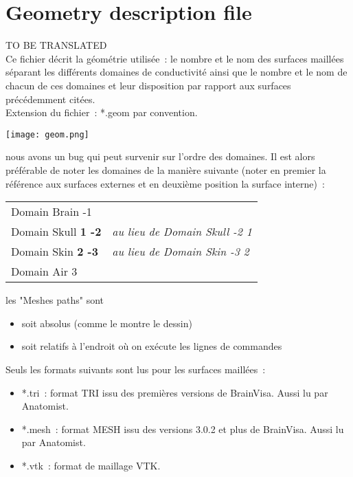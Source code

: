\section{Geometry description file}
\label{sect: annexe 1}
{\huge TO BE TRANSLATED}\\
\noindent
Ce fichier décrit la géométrie utilisée~: le nombre et le nom des surfaces maillées séparant les différents domaines de
conductivité ainsi que le nombre et le nom de chacun de ces domaines et leur disposition par rapport aux surfaces précédemment
citées.\\ 
Extension du fichier~: *.geom par convention. 

\centerline{\texttt{[image: geom.png]}}

\begin{note}
    nous avons un bug qui peut survenir sur l'ordre des domaines. Il est alors préférable de noter les domaines de la manière
    suivante (noter en premier la référence aux surfaces externes et en deuxième position la surface interne)~:

    \begin{tabular}{ll}
        Domain Brain -1              & \\
        Domain Skull \textbf{1 -2}	 &	\emph{au lieu de Domain Skull -2 1} \\
        Domain Skin \textbf{2 -3}	 &	\emph{au lieu de Domain Skin -3 2}  \\
        Domain Air 3                 &  \\
    \end{tabular}
\end{note}

\medskip

\begin{note}
    les "Meshes paths" sont 
    \begin{itemize}
        \item soit absolus (comme le montre le dessin)
        \item soit relatifs à l'endroit où on exécute les lignes de commandes 
    \end{itemize}
    Seuls les formats suivants sont lus pour les surfaces maillées~:
    \begin{itemize}
        \item *.tri~: format TRI issu des premières versions de BrainVisa. Aussi lu par Anatomist.
        \item *.mesh~: format MESH issu des versions 3.0.2 et plus de BrainVisa. Aussi lu par Anatomist.
        \item *.vtk~: format de maillage VTK.
    \end{itemize}
\end{note}



